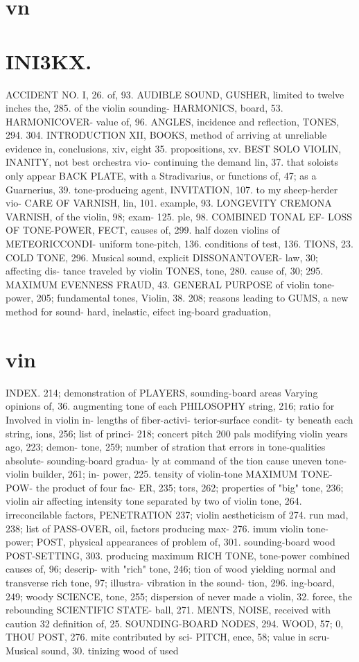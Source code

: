 \documentclass{article}
\begin{document}
\section*{vn}
\section*{INI3KX.}
ACCIDENT NO. I, 26. of, 93. AUDIBLE SOUND, GUSHER, limited to twelve inches the, 285. of the violin sounding- HARMONICS, board, 53. HARMONICOVER- value of, 96. ANGLES, incidence and reflection, TONES, 294. 304. INTRODUCTION XII, BOOKS, method of arriving at unreliable evidence in, conclusions, xiv, eight 35. propositions, xv. BEST SOLO VIOLIN, INANITY, not best orchestra vio- continuing the demand lin, 37. that soloists only appear BACK PLATE, with a Stradivarius, or functions of, 47; as a Guarnerius, 39. tone-producing agent, INVITATION, 107. to my sheep-herder vio- CARE OF VARNISH, lin, 101. example, 93. LONGEVITY CREMONA VARNISH, of the violin, 98; exam- 125. ple, 98. COMBINED TONAL EF- LOSS OF TONE-POWER, FECT, causes of, 299. half dozen violins of METEORICCONDI- uniform tone-pitch, 136. conditions of test, 136. TIONS, 23. COLD TONE, 296. Musical sound, explicit DISSONANTOVER- law, 30; affecting dis- tance traveled by violin TONES, tone, 280. cause of, 30; 295. MAXIMUM EVENNESS FRAUD, 43. GENERAL PURPOSE of violin tone-power, 205; fundamental tones, Violin, 38. 208; reasons leading to GUMS, a new method for sound- hard, inelastic, eifect ing-board graduation,

\section*{vin}
INDEX. 214; demonstration of PLAYERS, sounding-board areas Varying opinions of, 36. augmenting tone of each PHILOSOPHY string, 216; ratio for Involved in violin in- lengths of fiber-activi- terior-surface condit- ty beneath each string, ions, 256; list of princi- 218; concert pitch 200 pals modifying violin years ago, 223; demon- tone, 259; number of stration that errors in tone-qualities absolute- sounding-board gradua- ly at command of the tion cause uneven tone- violin builder, 261; in- power, 225. tensity of violin-tone MAXIMUM TONE-POW- the product of four fac- ER, 235; tors, 262; properties of "big" tone, 236; violin air affecting intensity tone separated by two of violin tone, 264. irreconcilable factors, PENETRATION 237; violin aestheticism of 274. run mad, 238; list of PASS-OVER, oil, factors producing max- 276. imum violin tone-power; POST, physical appearances of problem of, 301. sounding-board wood POST-SETTING, 303. producing maximum RICH TONE, tone-power combined causes of, 96; descrip- with "rich" tone, 246; tion of wood yielding normal and transverse rich tone, 97; illustra- vibration in the sound- tion, 296. ing-board, 249; woody SCIENCE, tone, 255; dispersion of never made a violin, 32. force, the rebounding SCIENTIFIC STATE- ball, 271. MENTS, NOISE, received with caution 32 definition of, 25. SOUNDING-BOARD NODES, 294. WOOD, 57; 0, THOU POST, 276. mite contributed by sci- PITCH, ence, 58; value in scru- Musical sound, 30. tinizing wood of used
\end{document}
